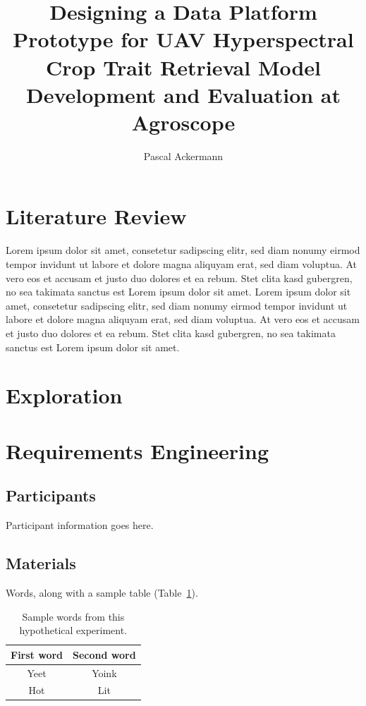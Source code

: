 \documentclass[stu,12pt,floatsintext]{apa7}
\title{Designing a Data Platform Prototype for UAV Hyperspectral Crop Trait Retrieval Model Development and Evaluation at Agroscope}
\author{Pascal Ackermann}
\begin{document}
 



\section{Literature Review}

Lorem ipsum dolor sit amet, consetetur sadipscing elitr, sed diam nonumy eirmod tempor invidunt ut labore et dolore magna aliquyam erat, sed diam voluptua. At vero eos et accusam et justo duo dolores et ea rebum. Stet clita kasd gubergren, no sea takimata sanctus est Lorem ipsum dolor sit amet. Lorem ipsum dolor sit amet, consetetur sadipscing elitr, sed diam nonumy eirmod tempor invidunt ut labore et dolore magna aliquyam erat, sed diam voluptua. At vero eos et accusam et justo duo dolores et ea rebum. Stet clita kasd gubergren, no sea takimata sanctus est Lorem ipsum dolor sit amet.


\section{Exploration}

\section{Requirements Engineering }

\subsection{Participants}

Participant information goes here.

\subsection{Materials}

Words, along with a sample table (Table~\ref{tab:table_words}).

\begin{table}
    \caption{Sample words from this hypothetical experiment.}
    \centering
    \begin{tabular}{cc} %
        \hline 
         First word & Second word \\
         \hline
         Yeet & Yoink \\
         Hot & Lit \\
         \hline
    \end{tabular}
    \label{tab:table_words}
\end{table}
\end{document}
